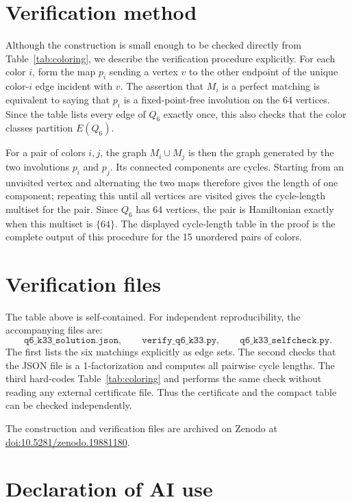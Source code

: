 \documentclass[11pt]{article}
\begin{document}
\section{Verification method}

Although the construction is small enough to be checked directly from
Table~\ref{tab:coloring}, we describe the verification procedure explicitly.
For each color \(i\), form the map \(p_i\) sending a vertex \(v\) to the other
endpoint of the unique color-\(i\) edge incident with \(v\).  The assertion
that \(M_i\) is a perfect matching is equivalent to saying that \(p_i\) is a
fixed-point-free involution on the 64 vertices.  Since the table lists every
edge of \(Q_6\) exactly once, this also checks that the color classes partition
\(E(Q_6)\).

For a pair of colors \(i,j\), the graph \(M_i\cup M_j\) is then the graph
generated by the two involutions \(p_i\) and \(p_j\).  Its connected
components are cycles.  Starting from an unvisited vertex and alternating the
two maps therefore gives the length of one component; repeating this until all
vertices are visited gives the cycle-length multiset for the pair.  Since
\(Q_6\) has 64 vertices, the pair is Hamiltonian exactly when this multiset is
\(\{64\}\).  The displayed cycle-length table in the proof is the complete
output of this procedure for the 15 unordered pairs of colors.

\section*{Verification files}

The table above is self-contained.  For independent reproducibility, the
accompanying files are:
\[
\texttt{q6\_k33\_solution.json},\qquad
\texttt{verify\_q6\_k33.py},\qquad
\texttt{q6\_k33\_selfcheck.py}.
\]
The first lists the six matchings explicitly as edge sets.  The second checks
that the JSON file is a 1-factorization and computes all pairwise cycle
lengths.  The third hard-codes Table~\ref{tab:coloring} and performs the same
check without reading any external certificate file.  Thus the certificate and
the compact table can be checked independently.

The construction and verification files are archived on Zenodo at
\href{https://doi.org/10.5281/zenodo.19881180}{doi:10.5281/zenodo.19881180}.

\section*{Declaration of AI use}
\end{document}
